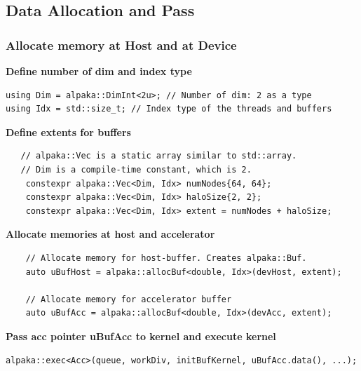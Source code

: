 \documentclass[9pt]{beamer}
\begin{document}
\begin{frame}
\begin{columns}
\end{columns}


    \end{frame}


\subsection{Data Allocation and Pass}


 \begin{frame}[fragile]
 \vspace{-0.2cm}
\frametitle{Allocate memory at Host and at Device}
\textbf{Define number of dim and index type}
\begin{lstlisting}
using Dim = alpaka::DimInt<2u>; // Number of dim: 2 as a type
using Idx = std::size_t; // Index type of the threads and buffers
 \end{lstlisting}

\textbf{Define extents for buffers}
\begin{lstlisting}
   // alpaka::Vec is a static array similar to std::array.
   // Dim is a compile-time constant, which is 2.
    constexpr alpaka::Vec<Dim, Idx> numNodes{64, 64};
    constexpr alpaka::Vec<Dim, Idx> haloSize{2, 2};
    constexpr alpaka::Vec<Dim, Idx> extent = numNodes + haloSize;
\end{lstlisting}

\textbf{Allocate memories at host and accelerator}
\begin{lstlisting}
    // Allocate memory for host-buffer. Creates alpaka::Buf.
    auto uBufHost = alpaka::allocBuf<double, Idx>(devHost, extent);

    // Allocate memory for accelerator buffer
    auto uBufAcc = alpaka::allocBuf<double, Idx>(devAcc, extent);
\end{lstlisting}
\textbf{Pass acc pointer uBufAcc to kernel and execute kernel}
\begin{lstlisting}
alpaka::exec<Acc>(queue, workDiv, initBufKernel, uBufAcc.data(), ...);
\end{lstlisting}
\end{frame}
\end{document}

